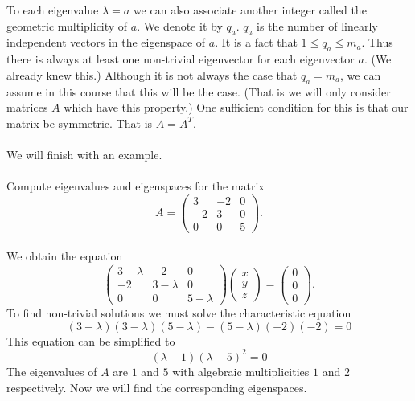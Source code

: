 \documentclass{amsart}
\begin{document}
To each eigenvalue $\lambda=a$ we can also associate another integer called the geometric multiplicity of $a$. We denote it by $q_{a}$. $q_{a}$ is the number of linearly independent vectors in the eigenspace of $a$. It is a fact that $1\leq q_{a}\leq m_{a}$. Thus there is always at least one non-trivial eigenvector for each eigenvector $a$. (We already knew this.) Although it is not always the case that $q_{a}=m_{a}$, we can assume in this course that this will be the case. (That is we will only consider matrices $A$ which have this property.) One sufficient condition for this is that our matrix be symmetric. That is $A=A^{T}$.\\
\\
We will finish with an example.\\
\\
Compute eigenvalues and eigenspaces for the matrix\\
\begin{equation*}
 A=
 \begin{pmatrix}
 3&-2&0\\
 -2&3&0\\
 0&0&5
 \end{pmatrix}.
\end{equation*}
\\
We obtain the equation
\begin{equation*}
 \begin{pmatrix}
 3-\lambda&-2&0\\
 -2&3-\lambda&0\\
 0&0&5-\lambda
 \end{pmatrix}
  \begin{pmatrix}
x\\
y\\
z
 \end{pmatrix}
 =
  \begin{pmatrix}
0\\
0\\
0
 \end{pmatrix}.
\end{equation*}
To find non-trivial solutions we must solve the characteristic equation\\
\begin{equation*}
(3-\lambda)(3-\lambda)(5-\lambda)-(5-\lambda)(-2)(-2)=0
\end{equation*}
This equation can be simplified to 
\begin{equation*}
(\lambda-1)(\lambda-5)^{2}=0
\end{equation*}
The eigenvalues of $A$ are $1$ and $5$ with algebraic multiplicities $1$ and $2$ respectively. Now we will find the corresponding eigenspaces.\\
\end{document}
